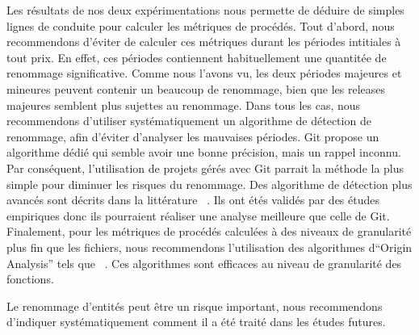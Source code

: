 Les résultats de nos deux expérimentations nous permette de déduire de simples lignes de conduite pour calculer les métriques de procédés. Tout d'abord, nous recommendons d'éviter de calculer ces métriques durant les périodes intitiales à tout prix. En effet, ces périodes contiennent habituellement une quantitée de renommage significative. Comme nous l'avons vu, les deux périodes majeures et mineures peuvent contenir un beaucoup de renommage, bien que les releases majeures semblent plus sujettes au renommage. Dans tous les cas, nous recommendons d'utiliser systématiquement un algorithme de détection de renommage, afin d'éviter d'analyser les mauvaises périodes. Git propose un algorithme dédié qui semble avoir une bonne précision, mais un rappel inconnu. Par conséquent, l'utilisation de projets gérés avec Git parrait la méthode la plus simple pour diminuer les risques du renommage. Des algorithme de détection plus avancés sont décrits dans la littérature ~\cite{antoniol_automatic_2004,lavoie_inferring_2012,steidl_incremental_2014}. Ils ont étés validés par des études empiriques donc ils pourraient réaliser une analyse meilleure que celle de Git. Finalement, pour les métriques de procédés calculées à des niveaux de granularité plus fin que les fichiers, nous recommendons l'utilisation des algorithmes d``Origin Analysis'' tels que ~\cite{wu_aura:_2010}. Ces algorithmes sont efficaces au niveau de granularité des fonctions.

Le renommage d'entités peut être un risque important, nous recommendons d'indiquer systématiquement comment il a été traité dans les études futures.\\       
